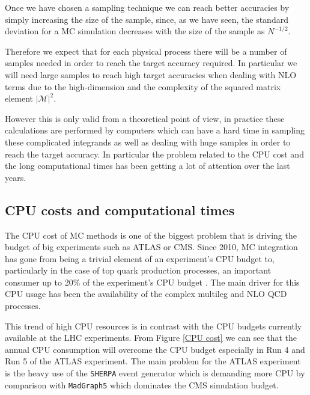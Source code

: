 \documentclass[../main/main.tex]{subfiles}
\begin{document}
Once we have chosen a sampling technique we can reach better accuracies by simply increasing the size of the sample, since, as we have seen, the 
standard deviation for a MC simulation decreases with the size of the sample as $N^{-1/2}$.

Therefore we expect that for each physical process there will be a number of samples needed in order to reach the target accuracy required. 
In particular we will need large samples to reach high target accuracies when dealing with NLO terms due to the high-dimension and the 
complexity of the squared matrix element $|\mathcal{M}|^2$.

However this is only valid from a theoretical point of view, in practice these calculations are performed by computers which can have a hard time
in sampling these complicated integrands as well as dealing with huge samples in order to reach the target accuracy.
In particular the problem related to the CPU cost and the long computational times has been getting a lot of attention over the last years.



\subsection{CPU costs and computational times}
\label{cost}
The CPU cost of MC methods is one of the biggest problem that is driving the budget of big experiments such as ATLAS or CMS.
Since 2010, MC integration has gone from being a trivial element of an experiment's CPU budget to, particularly in the case of top 
quark production processes, an important consumer up to 20\% of the experiment's CPU budget \cite{Buckley:2019wov}. 
The main driver for this CPU usage has been the availability of the complex multileg and NLO QCD processes. 

This trend of high CPU resources  is in contrast with the CPU budgets currently available at the LHC experiments.   
From Figure \ref{CPU cost} we can see that the annual CPU consumption will overcome the CPU budget especially in Run 4 and Run 5 of the ATLAS
experiment. 
The main problem for the ATLAS experiment is the heavy use of the \texttt{SHERPA} event generator which is demanding more CPU  by comparison with
\texttt{MadGraph5} which dominates the CMS simulation budget. 
\end{document}

